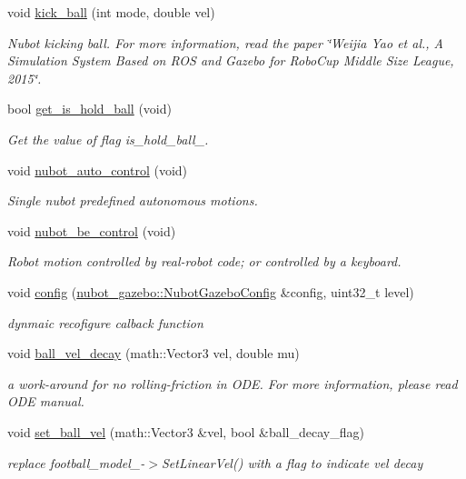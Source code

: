 \begin{DoxyCompactItemize}
void \hyperlink{classgazebo_1_1NubotGazebo_a0b8f02255ccde5f6768afb45fee8b81b}{kick\-\_\-ball} (int mode, double vel)
\begin{DoxyCompactList}\small\item\em Nubot kicking ball. For more information, read the paper \char`\"{}\-Weijia Yao et al., A Simulation System Based on R\-O\-S and Gazebo for Robo\-Cup Middle Size League, 2015\char`\"{}. \end{DoxyCompactList}\item 
bool \hyperlink{classgazebo_1_1NubotGazebo_a8366f268f6bba085201123d74b786368}{get\-\_\-is\-\_\-hold\-\_\-ball} (void)
\begin{DoxyCompactList}\small\item\em Get the value of flag is\-\_\-hold\-\_\-ball\-\_\-. \end{DoxyCompactList}\item 
void \hyperlink{classgazebo_1_1NubotGazebo_a991cc13697cbd1eaf855d21e4f5d78d2}{nubot\-\_\-auto\-\_\-control} (void)
\begin{DoxyCompactList}\small\item\em Single nubot predefined autonomous motions. \end{DoxyCompactList}\item 
void \hyperlink{classgazebo_1_1NubotGazebo_aaa7835337bbfd120b5b85af40ccf47ae}{nubot\-\_\-be\-\_\-control} (void)
\begin{DoxyCompactList}\small\item\em Robot motion controlled by real-\/robot code; or controlled by a keyboard. \end{DoxyCompactList}\item 
void \hyperlink{classgazebo_1_1NubotGazebo_a828269281839a4f18d30f02d20ad62b6}{config} (\hyperlink{classnubot__gazebo_1_1NubotGazeboConfig}{nubot\-\_\-gazebo\-::\-Nubot\-Gazebo\-Config} \&config, uint32\-\_\-t level)
\begin{DoxyCompactList}\small\item\em dynmaic recofigure calback function \end{DoxyCompactList}\item 
void \hyperlink{classgazebo_1_1NubotGazebo_a3a42f8965b7ccb35d0b6a0624c56ba86}{ball\-\_\-vel\-\_\-decay} (math\-::\-Vector3 vel, double mu)
\begin{DoxyCompactList}\small\item\em a work-\/around for no rolling-\/friction in O\-D\-E. For more information, please read O\-D\-E manual. \end{DoxyCompactList}\item 
void \hyperlink{classgazebo_1_1NubotGazebo_a5b5d4a3644867257cb379613072e9567}{set\-\_\-ball\-\_\-vel} (math\-::\-Vector3 \&vel, bool \&ball\-\_\-decay\-\_\-flag)
\begin{DoxyCompactList}\small\item\em replace football\-\_\-model\-\_\--\/$>$Set\-Linear\-Vel() with a flag to indicate vel decay \end{DoxyCompactList}\end{DoxyCompactItemize}
